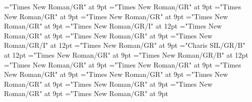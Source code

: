 \documentclass[gps1,twoside]{article}
\begin{document}
\font\spanspanrestrictionssensesensessensesensesentrybefore="Times New Roman/GR" at 9pt
\font\spanrestrictionssensesensessensesensesentryfirstchildbefore="Times New Roman/GR" at 9pt
\font\spanrestrictionssensesensessensesensesentrylastchildafter="Times New Roman/GR" at 9pt
\font\spanspanlexsensereferencessensesensessensesensesentrybefore="Times New Roman/GR" at 9pt
\font\lexsensereferencessensesensessensesensesentryafter="Times New Roman/GR" at 9pt
\font\spanenownertypeabbreviationlexsensereferencelexsensereferencessensesensessensesensesentry="Times New Roman/GR/I" at 12pt
\font\spanspanownertypeabbreviationlexsensereferencelexsensereferencessensesensessensesensesentrybefore="Times New Roman/GR" at 9pt
\font\spanownertypeabbreviationlexsensereferencelexsensereferencessensesensessensesensesentrylastchildafter="Times New Roman/GR" at 9pt
\font\spanownertypeabbreviationlexsensereferencelexsensereferencessensesensessensesensesentry="Times New Roman/GR/I" at 12pt
\font\configtargetconfigtargetconfigtargetslexsensereferencelexsensereferencessensesensessensesensesentrybefore="Times New Roman/GR" at 9pt
\font\spanbzhheadwordconfigtargetconfigtargetslexsensereferencelexsensereferencessensesensessensesensesentry="Charis SIL/GR/B" at 12pt
\font\spanspanheadwordconfigtargetconfigtargetslexsensereferencelexsensereferencessensesensessensesensesentrybefore="Times New Roman/GR" at 9pt
\font\spanheadwordconfigtargetconfigtargetslexsensereferencelexsensereferencessensesensessensesensesentry="Times New Roman/GR/B" at 12pt
\font\variantformentrybackrefvariantformentrybackrefvariantformentrybackrefssensesensessensesensesentrybefore="Times New Roman/GR" at 9pt
\font\variantformentrybackrefssensesensessensesensesentrybefore="Times New Roman/GR" at 9pt
\font\variantformentrybackrefssensesensessensesensesentryafter="Times New Roman/GR" at 9pt
\font\variantentrytypevariantentrytypevariantentrytypesvariantformentrybackrefvariantformentrybackrefssensesensessensesensesentrybefore="Times New Roman/GR" at 9pt
\font\variantentrytypesvariantformentrybackrefvariantformentrybackrefssensesensessensesensesentryafter="Times New Roman/GR" at 9pt
\font\spanspanreverseabbrvariantentrytypevariantentrytypesvariantformentrybackrefvariantformentrybackrefssensesensessensesensesentrybefore="Times New Roman/GR" at 9pt
\font\spanreverseabbrvariantentrytypevariantentrytypesvariantformentrybackrefvariantformentrybackrefssensesensessensesensesentrylastchildafter="Times New Roman/GR" at 9pt
\font\spanspanheadwordvariantformentrybackrefvariantformentrybackrefssensesensessensesensesentrybefore="Times New Roman/GR" at 9pt
\end{document}
